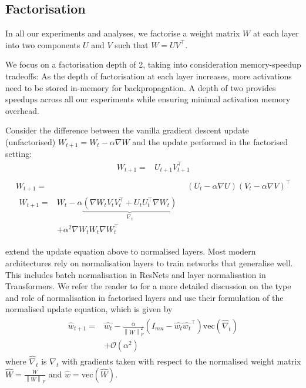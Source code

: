 \documentclass{article}
\newcommand{\norm}[2]{\left\lVert #1 \right\rVert_{#2}}
\begin{document}
\subsection{Factorisation}

In all our experiments and analyses, we factorise a weight matrix $W$ at each layer into two components $U$ and $V$ such that $W = UV^\top$. 

We focus on a factorisation depth of 2, taking into consideration memory-speedup tradeoffs: As the depth of factorisation at each layer increases, more activations need to be stored in-memory for backpropagation. A depth of two provides speedups across all our experiments while ensuring minimal activation memory overhead.

Consider the difference between the vanilla gradient descent update (unfactorised) \(W_{t+1} = W_t - \alpha \nabla W\) and the update performed in the factorised setting:
\begin{align*}
W_{t+1} ={}& U_{t+1} V_{t+1}^\top \nonumber \\ 
\end{align*}
\begin{align}
W_{t+1} ={}& (U_t - \alpha \nabla U)(V_t - \alpha \nabla V)^\top \nonumber \\ 
\begin{split}
W_{t+1} ={}& W_t - \alpha \underbrace{(\nabla W_t V_t V_t^\top + U_t U_t^\top \nabla W_t)}_{\nabla_t} \\
{}& + \alpha^2 \nabla W_t W_t \nabla W_t ^ \top
\label{fullupdate}
\end{split}
\end{align}

\cite{khodak2021initialization} extend the update equation above to normalised layers. Most modern architectures rely on normalisation layers to train networks that generalise well. This includes batch normalisation \cite{batchnorm} in ResNets and layer normalisation \cite{layernorm} in Transformers. We refer the reader to \cite{khodak2021initialization} for a more detailed discussion on the type and role of normalisation in factorised layers and use their formulation of the normalised update equation, which is given by
\begin{align}
\begin{split}
\hat{w}_{t+1} ={}& \hat{w_t} - \frac{\alpha}{\norm{W}{F}^2} (I_{mn} - \hat{w_t} \hat{w_t}^\top) \text{vec}(\hat{\nabla}_t) \\
{}& + \mathcal{O}(\alpha^2)
\end{split}
\label{normalizedupdate}
\end{align}
where $\hat{\nabla}_t$ is $\nabla_t$ with gradients taken with respect to the normalised weight matrix $\hat{W} = \frac{W}{\norm{W}{F}}$ and $\hat{w}=\text{vec}(\hat{W})$.
\end{document}
